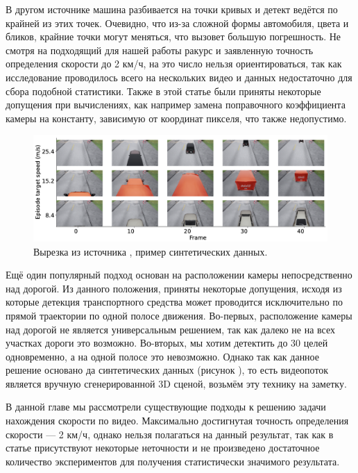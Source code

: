 \documentclass[specification,annotation,times]{itmo-student-thesis}
\begin{document}
В другом источнике \cite{6754885} машина разбивается на точки кривых и детект \cite{surveillance} ведётся по крайней из этих точек. Очевидно, что из-за сложной формы автомобиля, цвета и бликов, крайние точки могут меняться, что вызовет большую погрешность. Не смотря на подходящий для нашей работы ракурс и заявленную точность определения скорости до 2 км/ч, на это число нельзя ориентироваться, так как исследование \cite{6754885} проводилось всего на нескольких видео и данных недостаточно для сбора подобной статистики. Также  в этой статье были приняты некоторые допущения при вычислениях, как например замена поправочного коэффициента камеры на константу, зависимую от координат пикселя, что также недопустимо.


\begin{figure}[!ht]
	\caption{Вырезка из источника \cite{09903}, пример синтетических данных.}\label{img:syntet}
	\includegraphics[width=0.85\linewidth]{../png/syntet.png}
	\centering
\end{figure}

Ещё один популярный подход \cite{09903} основан на расположении камеры непосредственно над дорогой. Из данного положения, приняты некоторые допущения, исходя из которые детекция транспортного средства может проводится исключительно по прямой траектории по одной полосе движения. Во-первых, расположение камеры над дорогой не является универсальным решением, так как далеко не на всех участках дороги это возможно. Во-вторых, мы хотим детектить до 30 целей одновременно, а на одной полосе это невозможно. Однако так как данное решение основано да синтетических данных (рисунок ), то есть видеопоток является вручную сгенерированной 3D сценой, возьмём эту технику на заметку.


\finishrelatedwork

\chapterconclusion

В данной главе мы рассмотрели существующие подходы к решению задачи нахождения скорости по видео. Максимально достигнутая точность определения скорости --- 2 км/ч, однако нельзя полагаться на данный результат, так как в статье \cite{6754885} присутствуют некоторые неточности и не произведено достаточное количество экспериментов для получения статистически значимого результата.
\end{document}
